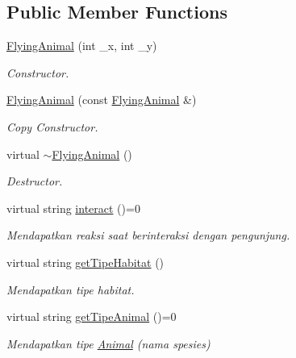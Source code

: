 \subsection*{Public Member Functions}
\begin{DoxyCompactItemize}
\item 
\hyperlink{classFlyingAnimal_abce03fb40df688bc103f6a9e5d185fd1}{Flying\-Animal} (int \-\_\-x, int \-\_\-y)
\begin{DoxyCompactList}\small\item\em Constructor. \end{DoxyCompactList}\item 
\hypertarget{classFlyingAnimal_ab2209a5b0286a65e2908a2fb7565e600}{\hyperlink{classFlyingAnimal_ab2209a5b0286a65e2908a2fb7565e600}{Flying\-Animal} (const \hyperlink{classFlyingAnimal}{Flying\-Animal} \&)}\label{classFlyingAnimal_ab2209a5b0286a65e2908a2fb7565e600}

\begin{DoxyCompactList}\small\item\em Copy Constructor. \end{DoxyCompactList}\item 
\hypertarget{classFlyingAnimal_a50a93cfcb6d0f216032279f463347544}{virtual \hyperlink{classFlyingAnimal_a50a93cfcb6d0f216032279f463347544}{$\sim$\-Flying\-Animal} ()}\label{classFlyingAnimal_a50a93cfcb6d0f216032279f463347544}

\begin{DoxyCompactList}\small\item\em Destructor. \end{DoxyCompactList}\item 
\hypertarget{classFlyingAnimal_ac0eee625fa2235eee8cbdc0a010ae430}{virtual string \hyperlink{classFlyingAnimal_ac0eee625fa2235eee8cbdc0a010ae430}{interact} ()=0}\label{classFlyingAnimal_ac0eee625fa2235eee8cbdc0a010ae430}

\begin{DoxyCompactList}\small\item\em Mendapatkan reaksi saat berinteraksi dengan pengunjung. \end{DoxyCompactList}\item 
virtual string \hyperlink{classFlyingAnimal_abc4d78229fe8a38ea786c519b4551e6e}{get\-Tipe\-Habitat} ()
\begin{DoxyCompactList}\small\item\em Mendapatkan tipe habitat. \end{DoxyCompactList}\item 
virtual string \hyperlink{classFlyingAnimal_a1523973b9a6a47e9064825c2134fd65d}{get\-Tipe\-Animal} ()=0
\begin{DoxyCompactList}\small\item\em Mendapatkan tipe \hyperlink{classAnimal}{Animal} (nama spesies) \end{DoxyCompactList}\end{DoxyCompactItemize}
